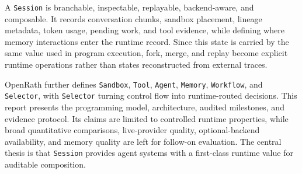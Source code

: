 A \texttt{Session} is branchable, inspectable, replayable, backend-aware, and composable. It records conversation chunks, sandbox placement, lineage metadata, token usage, pending work, and tool evidence, while defining where memory interactions enter the runtime record. Since this state is carried by the same value used in program execution, fork, merge, and replay become explicit runtime operations rather than states reconstructed from external traces.

OpenRath further defines \texttt{Sandbox}, \texttt{Tool}, \texttt{Agent}, \texttt{Memory}, \texttt{Workflow}, and \texttt{Selector}, with \texttt{Selector} turning control flow into runtime-routed decisions. This report presents the programming model, architecture, audited milestones, and evidence protocol. Its claims are limited to controlled runtime properties, while broad quantitative comparisons, live-provider quality, optional-backend availability, and memory quality are left for follow-on evaluation. The central thesis is that \texttt{Session} provides agent systems with a first-class runtime value for auditable composition.

